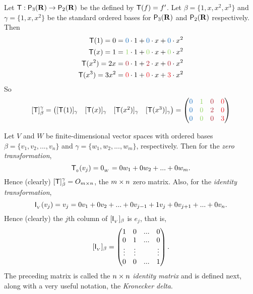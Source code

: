 \begin{example} \label{example 2.2.4}
Let \(\textsf{T} : \textsf{P}_3(\mathbf{R}) \to \textsf{P}_2(\mathbf{R})\) be the \LTRAN{} defined by \(\textsf{T}(f) = f'\).
Let \(\beta = \{ 1, x, x^2, x^3 \}\) and \(\gamma = \{ 1, x, x^2 \}\) be the standard ordered bases for \(\textsf{P}_3(\mathbf{R})\) and \(\textsf{P}_2(\mathbf{R})\)
respectively.
Then
\begin{align*}
         \T(1) = 0 & = \BLUE{0} \cdot 1 + \BLUE{0} \cdot x + \BLUE{0} \cdot x^2 \\
         \T(x) = 1 & = \GREEN{1} \cdot 1 + \GREEN{0} \cdot x + \GREEN{0} \cdot x^2 \\
      \T(x^2) = 2x & = \MAROON{0} \cdot 1 + \MAROON{2} \cdot x + \MAROON{0} \cdot x^2 \\
    \T(x^3) = 3x^2 & = \RED{0} \cdot 1 + \RED{0} \cdot x + \RED{3} \cdot x^2
\end{align*}
So
\[
    [\T]_{\beta}^{\gamma}
    = \begin{pmatrix}
     [\T(1)]_{\gamma} & [\T(x)]_{\gamma} & [\T(x^2)]_{\gamma} & [\T(x^3)]_{\gamma}
    \end{pmatrix}
    = \begin{pmatrix}
        \BLUE{0} & \GREEN{1} & \MAROON{0} & \RED{0} \\
        \BLUE{0} & \GREEN{0} & \MAROON{2} & \RED{0} \\
        \BLUE{0} & \GREEN{0} & \MAROON{0} & \RED{3}
    \end{pmatrix}
\]
\end{example}

\begin{additional definition} \label{adef}
Let \(V\) and \(W\) be finite-dimensional vector spaces with ordered bases \(\beta = \{ v_1, v_2, ..., v_n \}\) and \(\gamma = \{ w_1, w_2, ..., w_m \}\), respectively.
Then for the \emph{zero transformation},
\[
    \textsf{T}_{_0}(v_j) = 0_{_W} = 0 w_1 + 0 w_2 + ... + 0 w_m.
\]
Hence (clearly) \([\textsf{T}]_{\beta}^{\gamma} = O_{m \times n}\), the \(m \times n\) zero matrix.
Also, for the \emph{identity transformation},
\[
\textsf{I}_{_V}(v_j) = v_j = 0v_1 + 0v_2 + ... + 0v_{j - 1} + 1 v_j + 0 v_{j + 1} + ... + 0v_n.
\]
Hence (clearly) the \(j\)th column of \([\textsf{I}_{_V}]_{\beta}\) is \(e_j\), that is,
\[
    [\textsf{I}_{_V}]_{\beta} = \begin{pmatrix}
        1 & 0 & ... & 0 \\
        0 & 1 & ... & 0 \\
        \vdots & \vdots & & \vdots \\
        0 & 0 & ... & 1
    \end{pmatrix}.
\]
The preceding matrix is called the \(n \times n\) \emph{identity matrix} and is defined next, along with a very useful notation, the \emph{Kronecker delta}.
\end{additional definition}

